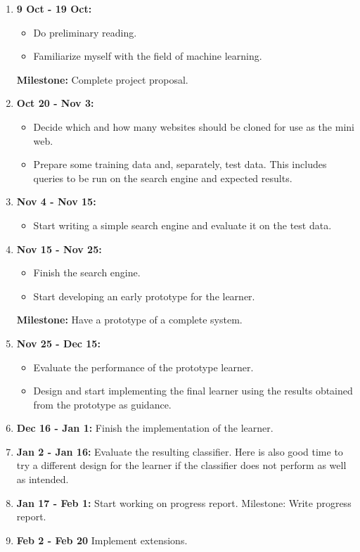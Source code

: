 \begin{enumerate}
\item {\bf 9 Oct - 19 Oct:} 
\begin{itemize}
\item Do preliminary reading.
\item Familiarize myself with the field of machine learning.
\end{itemize} 
{\bf Milestone: } Complete project proposal. 
\item {\bf Oct 20 - Nov 3:} 
    \begin{itemize}
    \item Decide which and how many websites should be cloned for use as the mini web.  
    \item Prepare some training data and, separately, test data. This includes queries to be run on the search engine and expected results. 
    \end{itemize}
\item {\bf Nov 4 - Nov 15:} 
    \begin{itemize}
    \item Start writing a simple search engine and evaluate it on the test data. 
    \end{itemize}
\item {\bf Nov 15 - Nov 25:} 
    \begin{itemize}
    \item Finish the search engine.
    \item Start developing an early prototype for the learner. 
    \end{itemize} 
    {\bf Milestone: } Have a prototype of a complete system.
\item {\bf Nov 25 - Dec 15:} 
\begin{itemize}
\item Evaluate the performance of the prototype learner. 
\item Design and start implementing the final learner using the results obtained from the prototype as guidance. 
\end{itemize}
\item {\bf Dec 16 - Jan 1:} Finish the implementation of the learner. 
\item {\bf Jan 2 - Jan 16:} 
     Evaluate the resulting classifier. Here is also good time to try a different design for the learner if the classifier does not perform as well as intended.
\item {\bf Jan 17 - Feb 1:} Start working on progress report.  
{Milestone: } Write progress report. 
\item {\bf Feb 2 - Feb 20} Implement extensions.


\end{enumerate}
